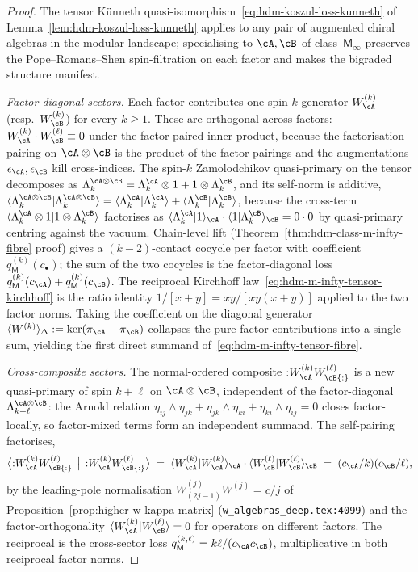\begin{proof}
The tensor K\"unneth
quasi-isomorphism~\eqref{eq:hdm-koszul-loss-kunneth} of
Lemma~\ref{lem:hdm-koszul-loss-kunneth} applies to any pair of
augmented chiral algebras in the modular landscape; specialising to
$\cA,\cB$ of class~$\mathsf M_\infty$ preserves the Pope--Romans--Shen
spin-filtration on each factor and makes the bigraded structure
manifest.

\emph{Factor-diagonal sectors.} Each factor contributes one spin-$k$
generator $W^{(k)}_\cA$ (resp.\ $W^{(k)}_\cB$) for every $k\geq 1$.
These are orthogonal across factors: $W^{(k)}_\cA\cdot W^{(\ell)}_\cB
\equiv 0$ under the factor-paired inner product, because the
factorisation pairing on
$\cA\otimes\cB$ is the product of the factor pairings and the
augmentations $\epsilon_\cA,\epsilon_\cB$ kill cross-indices. The
spin-$k$ Zamolodchikov quasi-primary on the tensor decomposes as
$\Lambda_k^{\cA\otimes\cB} = \Lambda_k^{\cA}\otimes 1 + 1\otimes
\Lambda_k^{\cB}$, and its self-norm is additive,
$\langle\Lambda_k^{\cA\otimes\cB}|\Lambda_k^{\cA\otimes\cB}\rangle
= \langle\Lambda_k^\cA|\Lambda_k^\cA\rangle
+ \langle\Lambda_k^\cB|\Lambda_k^\cB\rangle$, because the cross-term
$\langle\Lambda_k^\cA\otimes 1 | 1\otimes\Lambda_k^\cB\rangle$
factorises as $\langle\Lambda_k^\cA|1\rangle_\cA\cdot\langle
1|\Lambda_k^\cB\rangle_\cB = 0\cdot 0$ by quasi-primary centring
against the vacuum. Chain-level lift
(Theorem~\ref{thm:hdm-class-m-infty-fibre} proof) gives a
$(k-2)$-contact cocycle per factor with coefficient
$q_\mathsf M^{(k)}(c_\bullet)$; the sum of the two cocycles is the
factor-diagonal loss $q_\mathsf M^{(k)}(c_\cA)+q_\mathsf M^{(k)}(c_\cB)$.
The reciprocal Kirchhoff
law~\eqref{eq:hdm-m-infty-tensor-kirchhoff} is the ratio identity
$1/[x+y] = xy/[xy(x+y)]$ applied to the two factor norms. Taking
the coefficient on the diagonal generator $\langle W^{(k)}\rangle_\Delta
:= \ker(\pi_\cA-\pi_\cB)$ collapses the pure-factor contributions
into a single sum, yielding the first direct summand
of~\eqref{eq:hdm-m-infty-tensor-fibre}.

\emph{Cross-composite sectors.} The normal-ordered composite
${:}W^{(k)}_\cA W^{(\ell)}_\cB{:}$ is a new quasi-primary of spin
$k+\ell$ on $\cA\otimes\cB$, independent of the factor-diagonal
$\Lambda_{k+\ell}^{\cA\otimes\cB}$: the Arnold relation
$\eta_{ij}\wedge\eta_{jk}+\eta_{jk}\wedge\eta_{ki}+\eta_{ki}\wedge
\eta_{ij}=0$ closes factor-locally, so factor-mixed terms form an
independent summand. The self-pairing factorises,
\[
\bigl\langle{:}W^{(k)}_\cA W^{(\ell)}_\cB{:}\,\bigm|\,
{:}W^{(k)}_\cA W^{(\ell)}_\cB{:}\bigr\rangle
\;=\;\langle W^{(k)}_\cA | W^{(k)}_\cA\rangle_\cA\cdot
\langle W^{(\ell)}_\cB | W^{(\ell)}_\cB\rangle_\cB
\;=\;(c_\cA/k)(c_\cB/\ell),
\]
by the leading-pole normalisation
$W^{(j)}_{(2j-1)}W^{(j)} = c/j$ of
Proposition~\ref{prop:higher-w-kappa-matrix}
(\texttt{w\_algebras\_deep.tex:4099}) and the factor-orthogonality
$\langle W^{(k)}_\cA | W^{(\ell)}_\cB\rangle = 0$ for operators on
different factors. The reciprocal is the cross-sector loss
$q_\mathsf M^{(k,\ell)} = k\ell/(c_\cA c_\cB)$, multiplicative in
both reciprocal factor norms.


\end{proof}
